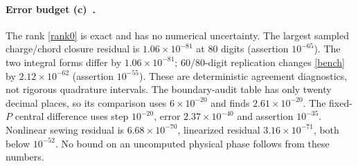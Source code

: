 \documentclass[11pt,a4paper]{article}
\newcommand{\C}{\textbf{(c)}\ }
\begin{document}
\paragraph{Error budget \C.}
The rank \eqref{rank0} is exact and has no numerical uncertainty. The largest
sampled charge/chord closure residual is $1.06\times10^{-81}$ at 80 digits
(assertion $10^{-65}$). The two integral forms differ by
$1.06\times10^{-81}$; 60/80-digit replication changes \eqref{bench} by
$2.12\times10^{-62}$ (assertion $10^{-55}$). These are deterministic agreement
diagnostics, not rigorous quadrature intervals. The boundary-audit table has
only twenty decimal places, so its comparison uses $6\times10^{-20}$ and
finds $2.61\times10^{-20}$. The fixed-$P$ central difference uses step
$10^{-20}$, error $2.37\times10^{-40}$ and assertion $10^{-35}$.
Nonlinear sewing residual is $6.68\times10^{-70}$, linearized residual
$3.16\times10^{-71}$, both below $10^{-52}$. No bound on an uncomputed
physical phase follows from these numbers.
\end{document}
